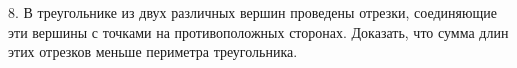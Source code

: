 8. В треугольнике из двух различных вершин проведены отрезки, соединяющие эти вершины с точками на противоположных сторонах. Доказать, что сумма длин этих отрезков меньше периметра треугольника.\\
